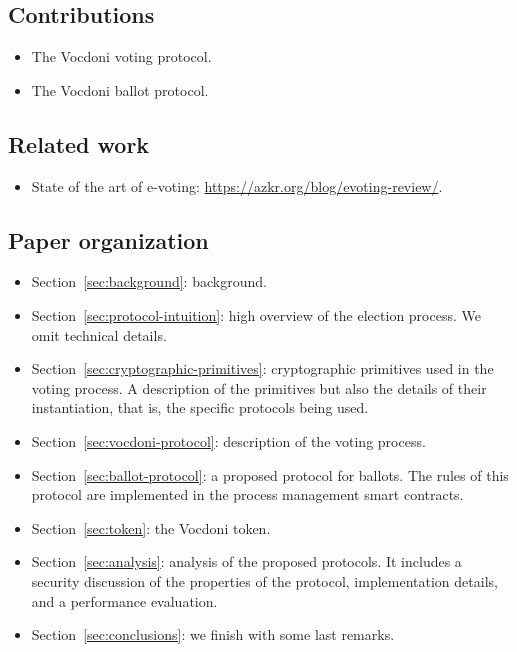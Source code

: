 
\subsection{Contributions}
\label{sec:introduction:contributions}

\begin{itemize}
	\item The Vocdoni voting protocol.
	\item The Vocdoni ballot protocol.
\end{itemize}

\subsection{Related work}
\label{sec:introduction:sota}

\begin{itemize}
	\item State of the art of e-voting: \url{https://azkr.org/blog/evoting-review/}.
\end{itemize}

\subsection{Paper organization}
\label{sec:introduction:organization}

\begin{itemize}
	\item Section~\ref{sec:background}: background.
	\item Section~\ref{sec:protocol-intuition}: high overview of the election process. We omit technical details.
	\item Section~\ref{sec:cryptographic-primitives}: cryptographic primitives used in the voting process. A description of the primitives but also the details of their instantiation, that is, the specific protocols being used.
	\item Section~\ref{sec:vocdoni-protocol}: description of the voting process.
	\item Section~\ref{sec:ballot-protocol}: a proposed protocol for ballots. The rules of this protocol are implemented in the process management smart contracts.
	\item Section~\ref{sec:token}: the Vocdoni token.
	\item Section~\ref{sec:analysis}: analysis of the proposed protocols. It includes a security discussion of the properties of the protocol, implementation details, and a performance evaluation.
	\item Section~\ref{sec:conclusions}: we finish with some last remarks.
\end{itemize}